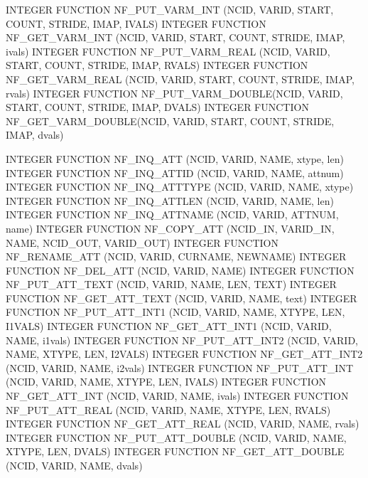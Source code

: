 \begin{DoxyCode}
INTEGER FUNCTION  NF\_PUT\_VARM\_INT   (NCID, VARID, START, COUNT, STRIDE,
                                     IMAP, IVALS)
INTEGER FUNCTION  NF\_GET\_VARM\_INT   (NCID, VARID, START, COUNT, STRIDE,
                                     IMAP, ivals)
INTEGER FUNCTION  NF\_PUT\_VARM\_REAL  (NCID, VARID, START, COUNT, STRIDE,
                                     IMAP, RVALS)
INTEGER FUNCTION  NF\_GET\_VARM\_REAL  (NCID, VARID, START, COUNT, STRIDE,
                                     IMAP, rvals)
INTEGER FUNCTION  NF\_PUT\_VARM\_DOUBLE(NCID, VARID, START, COUNT, STRIDE,
                                     IMAP, DVALS)
INTEGER FUNCTION  NF\_GET\_VARM\_DOUBLE(NCID, VARID, START, COUNT, STRIDE,
                                     IMAP, dvals)

INTEGER FUNCTION  NF\_INQ\_ATT        (NCID, VARID, NAME, xtype, len)
INTEGER FUNCTION  NF\_INQ\_ATTID      (NCID, VARID, NAME, attnum)
INTEGER FUNCTION  NF\_INQ\_ATTTYPE    (NCID, VARID, NAME, xtype)
INTEGER FUNCTION  NF\_INQ\_ATTLEN     (NCID, VARID, NAME, len)
INTEGER FUNCTION  NF\_INQ\_ATTNAME    (NCID, VARID, ATTNUM, name)
INTEGER FUNCTION  NF\_COPY\_ATT       (NCID\_IN, VARID\_IN, NAME,
                                     NCID\_OUT, VARID\_OUT)
INTEGER FUNCTION  NF\_RENAME\_ATT     (NCID, VARID, CURNAME, NEWNAME)
INTEGER FUNCTION  NF\_DEL\_ATT        (NCID, VARID, NAME)
INTEGER FUNCTION  NF\_PUT\_ATT\_TEXT   (NCID, VARID, NAME, LEN, TEXT)
INTEGER FUNCTION  NF\_GET\_ATT\_TEXT   (NCID, VARID, NAME, text)
INTEGER FUNCTION  NF\_PUT\_ATT\_INT1   (NCID, VARID, NAME, XTYPE, LEN,
                                     I1VALS)
INTEGER FUNCTION  NF\_GET\_ATT\_INT1   (NCID, VARID, NAME, i1vals)
INTEGER FUNCTION  NF\_PUT\_ATT\_INT2   (NCID, VARID, NAME, XTYPE, LEN,
                                     I2VALS)
INTEGER FUNCTION  NF\_GET\_ATT\_INT2   (NCID, VARID, NAME, i2vals)
INTEGER FUNCTION  NF\_PUT\_ATT\_INT    (NCID, VARID, NAME, XTYPE, LEN,
                                     IVALS)
INTEGER FUNCTION  NF\_GET\_ATT\_INT    (NCID, VARID, NAME, ivals)
INTEGER FUNCTION  NF\_PUT\_ATT\_REAL   (NCID, VARID, NAME, XTYPE, LEN,
                                     RVALS)
INTEGER FUNCTION  NF\_GET\_ATT\_REAL   (NCID, VARID, NAME, rvals)
INTEGER FUNCTION  NF\_PUT\_ATT\_DOUBLE (NCID, VARID, NAME, XTYPE, LEN,
                                     DVALS)
INTEGER FUNCTION  NF\_GET\_ATT\_DOUBLE (NCID, VARID, NAME, dvals)


\end{DoxyCode}

